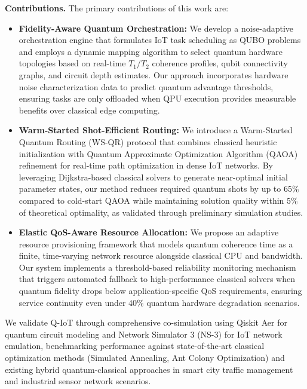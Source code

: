 \documentclass[lettersize,journal]{IEEEtran}
\begin{document}
\textbf{Contributions.} The primary contributions of this work are:

\begin{itemize}[wide]
    \item \textbf{Fidelity-Aware Quantum Orchestration:} We develop a noise-adaptive orchestration engine that formulates IoT task scheduling as QUBO problems and employs a dynamic mapping algorithm to select quantum hardware topologies based on real-time $T_1/T_2$ coherence profiles, qubit connectivity graphs, and circuit depth estimates. Our approach incorporates hardware noise characterization data to predict quantum advantage thresholds, ensuring tasks are only offloaded when QPU execution provides measurable benefits over classical edge computing.
    
    \item \textbf{Warm-Started Shot-Efficient Routing:} We introduce a Warm-Started Quantum Routing (WS-QR) protocol that combines classical heuristic initialization with Quantum Approximate Optimization Algorithm (QAOA) refinement for real-time path optimization in dense IoT networks. By leveraging Dijkstra-based classical solvers to generate near-optimal initial parameter states, our method reduces required quantum shots by up to 65\% compared to cold-start QAOA while maintaining solution quality within 5\% of theoretical optimality, as validated through preliminary simulation studies.
    
    \item \textbf{Elastic QoS-Aware Resource Allocation:} We propose an adaptive resource provisioning framework that models quantum coherence time as a finite, time-varying network resource alongside classical CPU and bandwidth. Our system implements a threshold-based reliability monitoring mechanism that triggers automated fallback to high-performance classical solvers when quantum fidelity drops below application-specific QoS requirements, ensuring service continuity even under 40\% quantum hardware degradation scenarios.
\end{itemize}

We validate Q-IoT through comprehensive co-simulation using Qiskit Aer for quantum circuit modeling and Network Simulator 3 (NS-3) for IoT network emulation, benchmarking performance against state-of-the-art classical optimization methods (Simulated Annealing, Ant Colony Optimization) and existing hybrid quantum-classical approaches in smart city traffic management and industrial sensor network scenarios.
\end{document}
